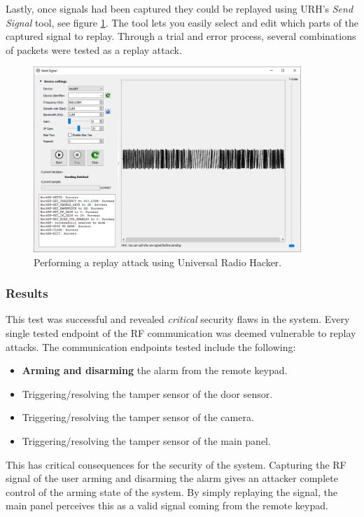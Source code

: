 Lastly, once signals had been captured they could be replayed using URH's \textit{Send Signal} tool, see figure \ref{fig:uhr-replay-tool}. The tool lets you easily select and edit which parts of the captured signal to replay. Through a trial and error process, several combinations of packets were tested as a replay attack.
\begin{figure}[!ht]
    \centering
    \includegraphics[width=0.9\textwidth]{images/6-pentesting/replay-signal.png}
    \caption{Performing a replay attack using Universal Radio Hacker.}
    \label{fig:uhr-replay-tool}
\end{figure}

\subsubsection{Results}
This test was successful and revealed \textit{critical} security flaws in the system. Every single tested endpoint of the RF communication was deemed vulnerable to replay attacks. The communication endpoints tested include the following:
\begin{itemize}
    \item \textbf{Arming and disarming} the alarm from the remote keypad.
    \item Triggering/resolving the tamper sensor of the door sensor.
    \item Triggering/resolving the tamper sensor of the camera.
    \item Triggering/resolving the tamper sensor of the main panel.
\end{itemize}
This has critical consequences for the security of the system. Capturing the RF signal of the user arming and disarming the alarm gives an attacker complete control of the arming state of the system. By simply replaying the signal, the main panel perceives this as a valid signal coming from the remote keypad.

